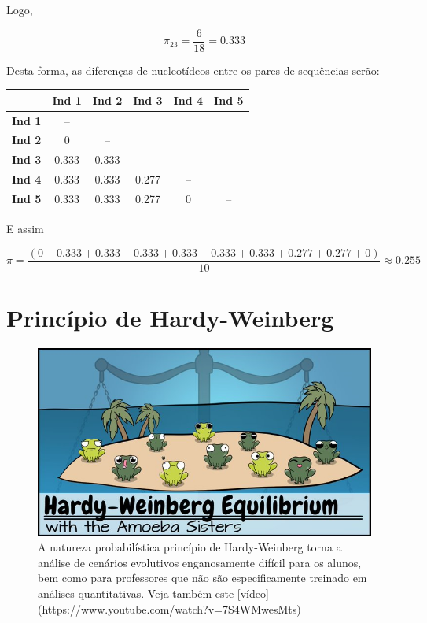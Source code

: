 \documentclass[
]{book}
\begin{document}
Logo,

\[\pi_{23} = \frac {6}{18} = 0.333\]

Desta forma, as diferenças de nucleotídeos entre os pares de sequências serão:

\begin{longtable}[]{@{}lccccc@{}}
\toprule()
& Ind 1 & Ind 2 & Ind 3 & Ind 4 & Ind 5 \\
\midrule()
\endhead
\textbf{Ind 1} & -- & & & & \\
\textbf{Ind 2} & 0 & -- & & & \\
\textbf{Ind 3} & 0.333 & 0.333 & -- & & \\
\textbf{Ind 4} & 0.333 & 0.333 & 0.277 & -- & \\
\textbf{Ind 5} & 0.333 & 0.333 & 0.277 & 0 & -- \\
\bottomrule()
\end{longtable}

E assim

\[\pi = \frac{\left( 0+0.333+0.333+0.333+0.333+0.333+0.333+0.277+0.277+0 \right)}{10} \approx 0.255\]

\hypertarget{princuxedpio-de-hardy-weinberg}{%
\chapter{Princípio de Hardy-Weinberg}\label{princuxedpio-de-hardy-weinberg}}

\begin{figure}

{\centering \includegraphics[width=600px]{figs/amoeba_sisters_HW} 

}

\caption{A natureza probabilística princípio de Hardy-Weinberg torna a análise de cenários evolutivos enganosamente difícil para os alunos, bem como para professores que não são especificamente treinado em análises quantitativas. Veja também este [vídeo](https://www.youtube.com/watch?v=7S4WMwesMts)}\label{fig:amoebahw}
\end{figure}
\end{document}
